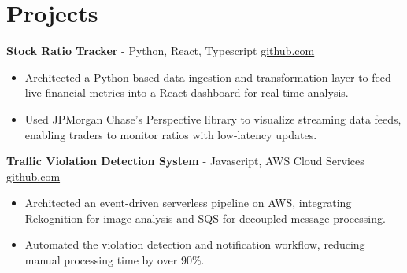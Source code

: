 \documentclass[11pt]{article}       %
\begin{document}

\vspace{-18.5pt}

\section*{Projects}

\textbf{Stock Ratio Tracker}{ - Python, React, Typescript} \hfill \href{https://github.com/Monica20030707/tradingDashboard-UI}{github.com} \\
\vspace{-9pt}
\begin{itemize}
  \item Architected a Python-based data ingestion and transformation layer to feed live financial metrics into a React dashboard for real-time analysis.
  \item Used JPMorgan Chase’s Perspective library to visualize streaming data feeds, enabling traders to monitor ratios with low-latency updates.
\end{itemize}

\textbf{Traffic Violation Detection System}{ - Javascript, AWS Cloud Services} \hfill \href{https://github.com/Monica20030707/AWS_rekonigition-N-read-database}{github.com} \\
\vspace{-9pt}
\begin{itemize}
  \item Architected an event-driven serverless pipeline on AWS, integrating Rekognition for image analysis and SQS for decoupled message processing.
  \item Automated the violation detection and notification workflow, reducing manual processing time by over 90\%.
\end{itemize}
\end{document}

